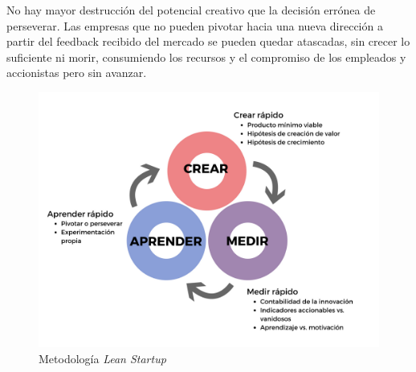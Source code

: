 No hay mayor destrucción del potencial creativo que la decisión errónea de perseverar. Las empresas que no pueden pivotar hacia una nueva dirección a partir del feedback recibido del mercado se pueden quedar atascadas, sin crecer lo suficiente ni morir, consumiendo los recursos y el compromiso de los empleados y accionistas pero sin avanzar\cite{ericries2011}.

\begin{figure}[htbp] 
    \centering
    \includegraphics[width=1\textwidth]{figuras/lean_startup.png}
    \caption{Metodología \textit{Lean Startup}}
    \label{fig:lean_startup}
\end{figure}	



